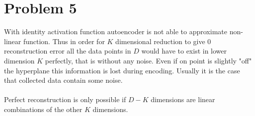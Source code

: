 \documentclass{article}
\begin{document}
\section{Problem 5}
With identity activation function autoencoder is not able to approximate non-linear
function. Thus in order for $K$ dimensional reduction to give $0$ reconstruction error
all the data points in $D$ would have to exist in lower dimension $K$ perfectly, that is without
any noise. Even if on point is slightly "off" the hyperplane this information is lost during encoding.
Usually it is the case that collected data contain some noise.
\\\\
Perfect reconstruction is only possible if $D-K$ dimensions are linear combinations
of the other $K$ dimensions.
\end{document}
